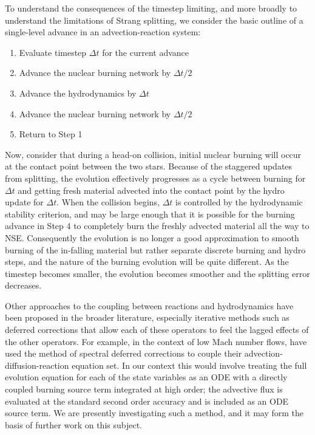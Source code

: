 \documentclass[twocolumn,numberedappendix]{../aastex6}
\begin{document}
To understand the consequences of the timestep limiting, and more broadly to 
understand the limitations of Strang splitting, we consider the 
basic outline of a single-level advance in an advection-reaction system:
\begin{enumerate}
  \item Evaluate timestep $\Delta t$ for the current advance
  \item Advance the nuclear burning network by $\Delta t / 2$
  \item Advance the hydrodynamics by $\Delta t$
  \item Advance the nuclear burning network by $\Delta t / 2$
  \item Return to Step 1
\end{enumerate}
Now, consider that during a head-on collision, initial nuclear burning 
will occur at the contact point between the two stars. Because of 
the staggered updates from splitting, the evolution effectively progresses 
as a cycle between burning for $\Delta t$ and getting fresh material 
advected into the contact point by the hydro update for $\Delta t$. 
When the collision begins, $\Delta t$ is controlled by the hydrodynamic 
stability criterion, and may be large enough that it is possible for 
the burning advance in Step 4 to completely burn the freshly advected 
material all the way to NSE. Consequently the evolution is no longer 
a good approximation to smooth burning of the in-falling material but
rather separate discrete burning and hydro steps, and the nature of 
the burning evolution will be quite different. As the timestep becomes
smaller, the evolution becomes smoother and the splitting error decreases.

Other approaches to the coupling 
between reactions and hydrodynamics have been proposed in the 
broader literature, especially iterative methods such as 
deferred corrections that allow each of these operators to 
feel the lagged effects of the other operators. For example,
in the context of low Mach number flows, \cite{nonaka:2012} have
used the method of spectral deferred corrections \citep{SDC} to
couple their advection-diffusion-reaction equation set. In our
context this would involve treating the full evolution equation
for each of the state variables as an ODE with a directly coupled
burning source term integrated at high order; the advective
flux is evaluated at the standard second order accuracy
and is included as an ODE source term.
We are presently investigating such a method,
and it may form the basis of further work on this subject.
\end{document}
